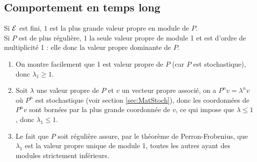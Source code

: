 % 
% 

\subsection{Comportement en temps long}  

\begin{proposition} \label{prop:perronFrobeniusCM}
  Si $\mathcal{E}$ est fini, $1$ est la plus grande valeur propre en module de $P$. \\
  Si $P$ est de plus régulière, $1$ la seule valeur propre de module 1 et est d'ordre de multiplicité 1 : elle donc la valeur propre dominante de $P$.
\end{proposition}

\proof
\begin{enumerate}
 \item On montre facilement que 1 est valeur propre de $P$ (car $P$ est stochastique), donc $\lambda_1 \geq 1$.
 \item Soit $\lambda$ une valeur propre de $P$ et $v$ un vecteur propre associé, on a $P^n v = \lambda^n v$ où $P^n$ est stochastique (voir section \ref{sec:MatStoch}), donc les coordonnées de $P^n v$ sont bornées par la plus grande coordonnée de $v$, ce qui impose que $\lambda \leq 1$, donc $\lambda_1 \leq 1$.
 \item Le fait que $P$ soit régulière assure, par le théorème de Perron-Frobenius, que $\lambda_1$ est la valeur propre unique de module 1, toutes les autres ayant des modules strictement inférieurs. 
\end{enumerate}
\eproof

